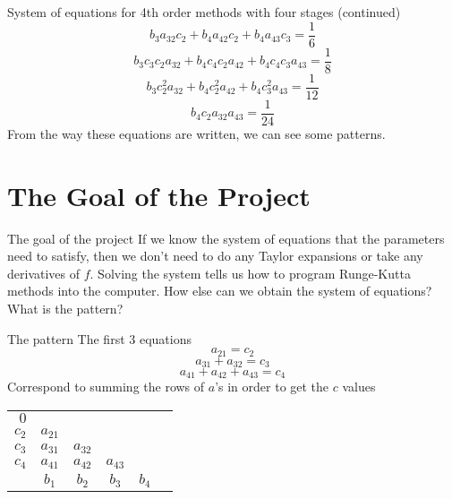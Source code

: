 \documentclass[12pt]{beamer}
\begin{document}
\begin{frame}{System of equations for 4th order methods with four stages (continued)}
  $$b_3a_{32}c_2 + b_4a_{42}c_2 + b_4a_{43}c_3 = \frac{1}{6}$$
  $$b_3c_3c_2a_{32} + b_4c_4c_2a_{42} + b_4c_4c_3a_{43} = \frac{1}{8}$$
  $$b_3c_2^2a_{32} + b_4c_2^2a_{42} + b_4c_3^2a_{43} = \frac{1}{12}$$
  $$b_4c_2a_{32}a_{43} = \frac{1}{24}$$
  \pause
  From the way these equations are written, we can see some patterns.
\end{frame}

\section[Project Goal]{The Goal of the Project}
\begin{frame}{The goal of the project}
  If we know the system of equations that the parameters need to satisfy,
  then we don't need to do any Taylor expansions or take any derivatives of $f$. \newline
  \newline
  \pause
  Solving the system tells us how to program Runge-Kutta methods into the computer. \newline
  \newline
  \pause
  How else can we obtain the system of equations? \newline
  \newline
  \pause
  What is the pattern?
\end{frame}

\begin{frame}{The pattern} 
  The first 3 equations
  $$a_{21} = c_2$$
  $$a_{31} + a_{32} = c_3$$
  $$a_{41} + a_{42} + a_{43} = c_4$$
  Correspond to summing the rows of $a$'s in order to get the $c$ values
  \begin{table}
  \centering
  \renewcommand{\arraystretch}{1.25}
     \begin{tabular}{r | c*{4}{c}}
                        $0$ \\
                    $c_2$ & $a_{21}$ \\
                    $c_3$ & $a_{31}$ & $a_{32}$ \\
	        $c_4$ &  $a_{41}$  &  $a_{42}$  & $a_{43}$\\
                     \hline
    \phantom{c4}     & $b_1$ & $b_2$ & $b_3$ & $b_4$ \\
    \end{tabular}
  \renewcommand{\arraystretch}{1.0}
  \end{table}
\end{frame}
\end{document}
